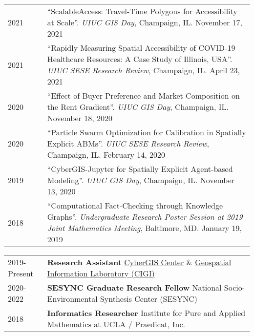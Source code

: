 \documentclass{acmcv}
\begin{document}
    \begin{longtable}{p{0.16\linewidth} p{0.84\linewidth}}
        2021 & ``ScalableAccess: Travel-Time Polygons for Accessibility at Scale''. \textit{UIUC GIS Day}, Champaign, IL. November 17, 2021 \\

        2021 & ``Rapidly Measuring Spatial Accessibility of COVID-19 Healthcare Resources: A Case Study of Illinois, USA''. \textit{UIUC SESE Research Review}, Champaign, IL. April 23, 2021 \\ 

        2020 & ``Effect of Buyer Preference and Market Composition on the Rent Gradient''. \textit{UIUC GIS Day}, Champaign, IL. November 18, 2020 \\

        2020 & ``Particle Swarm Optimization for Calibration in Spatially Explicit ABMs''. \textit{UIUC SESE Research Review}, Champaign, IL. February 14, 2020 \\ 

        2019 & ``CyberGIS-Jupyter for Spatially Explicit Agent-based Modeling''. \textit{UIUC GIS Day}, Champaign, IL. November 13, 2020 \\

        2018 & ``Computational Fact-Checking through Knowledge Graphs''. \textit{Undergraduate Research Poster Session at 2019 Joint Mathematics Meeting}, Baltimore, MD. January 19, 2019 \\
    \end{longtable}

\pagebreak

    \begin{longtable}{p{0.16\linewidth} p{0.84\linewidth}}
        2019-Present & \textbf{Research Assistant} \newline \href{https://cybergis.illinois.edu/}{CyberGIS Center} \& \href{http://www.cigi.illinois.edu/}{Geospatial Information Laboratory (CIGI)}\\

        2020-2022 & \textbf{SESYNC Graduate Research Fellow} \newline National Socio-Environmental Synthesis Center (SESYNC)\\

        2018 & \textbf{Informatics Researcher} \newline Institute for Pure and Applied Mathematics at UCLA / Praedicat, Inc.\\
    \end{longtable}
\end{document}
